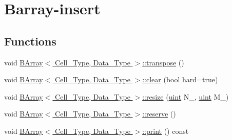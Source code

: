 \hypertarget{group__barray-insert}{}\section{Barray-\/insert}
\label{group__barray-insert}
\subsection*{Functions}
\begin{DoxyCompactItemize}
\item 
void \hyperlink{group__barray-insert_ga0284f7f2148b7c1b474ebe01f6548b98}{B\+Array$<$ Cell\+\_\+\+Type, Data\+\_\+\+Type $>$\+::transpose} ()
\item 
void \hyperlink{group__barray-insert_ga6dd5ebff333b376c6fb569e48290935f}{B\+Array$<$ Cell\+\_\+\+Type, Data\+\_\+\+Type $>$\+::clear} (bool hard=true)
\item 
void \hyperlink{group__barray-insert_gaefe411fe1890273518bfbc3f8ca616ce}{B\+Array$<$ Cell\+\_\+\+Type, Data\+\_\+\+Type $>$\+::resize} (\hyperlink{typedefs_8hpp_a91ad9478d81a7aaf2593e8d9c3d06a14}{uint} N\+\_\+, \hyperlink{typedefs_8hpp_a91ad9478d81a7aaf2593e8d9c3d06a14}{uint} M\+\_\+)
\item 
void \hyperlink{group__barray-insert_ga5eacd388e3d0f638f2c35b6e0f0c490c}{B\+Array$<$ Cell\+\_\+\+Type, Data\+\_\+\+Type $>$\+::reserve} ()
\item 
void \hyperlink{group__barray-insert_ga9d150c44b23cf1e4af45f540508db1de}{B\+Array$<$ Cell\+\_\+\+Type, Data\+\_\+\+Type $>$\+::print} () const
\end{DoxyCompactItemize}
